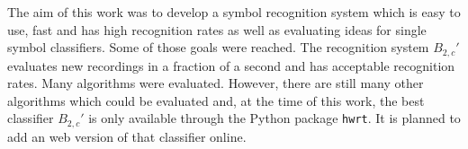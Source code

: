 \documentclass[9pt,technote]{IEEEtran}
\begin{document}
The aim of this work was to develop a symbol recognition system which is easy
to use, fast and has high recognition rates as well as evaluating ideas for
single symbol classifiers. Some of those goals were reached. The recognition
system $B_{2,c}'$ evaluates new recordings in a fraction of a second and has
acceptable recognition rates. Many algorithms were evaluated.
However, there are still many other algorithms which could be evaluated and, at
the time of this work, the best classifier $B_{2,c}'$ is only available
through the Python package \texttt{hwrt}. It is planned to add an web version
of that classifier online.



\end{document}
